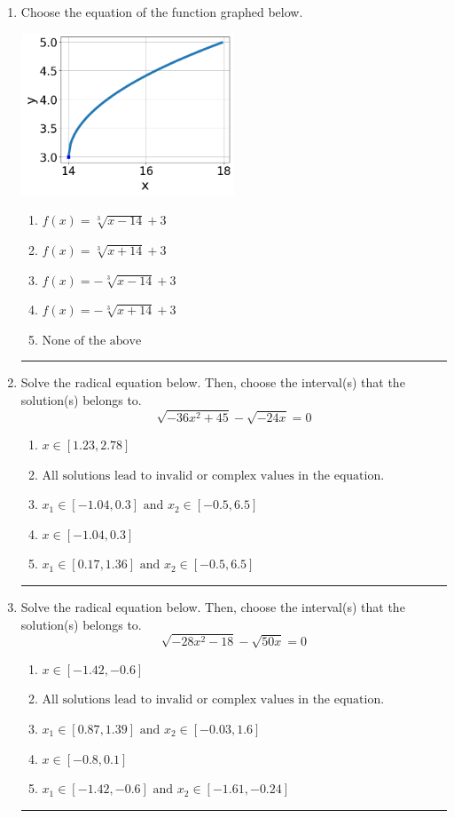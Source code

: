 \documentclass[14pt]{extbook}
\newcommand{\litem}[1]{\item#1\hspace*{-1cm}\rule{\textwidth}{0.4pt}}
\begin{document}
\begin{enumerate}
\litem{
Choose the equation of the function graphed below.
\begin{center}
    \includegraphics[width=0.5\textwidth]{../Figures/radicalGraphToEquationC.png}
\end{center}
\begin{enumerate}[label=\Alph*.]
\item \( f(x) = \sqrt[3]{x - 14} + 3 \)
\item \( f(x) = \sqrt[3]{x + 14} + 3 \)
\item \( f(x) = - \sqrt[3]{x - 14} + 3 \)
\item \( f(x) = - \sqrt[3]{x + 14} + 3 \)
\item \( \text{None of the above} \)

\end{enumerate} }
\litem{
Solve the radical equation below. Then, choose the interval(s) that the solution(s) belongs to.\[ \sqrt{-36 x^2 + 45} - \sqrt{-24 x} = 0 \]\begin{enumerate}[label=\Alph*.]
\item \( x \in [1.23,2.78] \)
\item \( \text{All solutions lead to invalid or complex values in the equation.} \)
\item \( x_1 \in [-1.04, 0.3] \text{ and } x_2 \in [-0.5,6.5] \)
\item \( x \in [-1.04,0.3] \)
\item \( x_1 \in [0.17, 1.36] \text{ and } x_2 \in [-0.5,6.5] \)

\end{enumerate} }
\litem{
Solve the radical equation below. Then, choose the interval(s) that the solution(s) belongs to.\[ \sqrt{-28 x^2 - 18} - \sqrt{50 x} = 0 \]\begin{enumerate}[label=\Alph*.]
\item \( x \in [-1.42,-0.6] \)
\item \( \text{All solutions lead to invalid or complex values in the equation.} \)
\item \( x_1 \in [0.87, 1.39] \text{ and } x_2 \in [-0.03,1.6] \)
\item \( x \in [-0.8,0.1] \)
\item \( x_1 \in [-1.42, -0.6] \text{ and } x_2 \in [-1.61,-0.24] \)


\end{enumerate}}
\end{enumerate}
\end{document}
